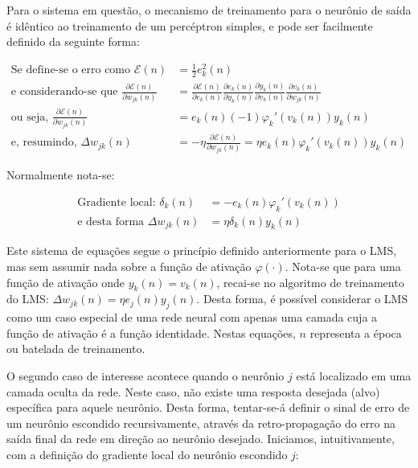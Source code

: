 Para o sistema em questão, o mecanismo de treinamento para o neurônio de saída
é idêntico ao treinamento de um percéptron simples, e pode ser facilmente
definido da seguinte forma:

\begin{align}
\text{Se define-se o erro como } \mathcal{E}(n) &= \frac{1}{2}e_{k}^{2}(n)
\label{eq:error-def} \\
\text{e considerando-se que } \frac{\partial\mathcal{E}(n)}{\partial
w_{jk}(n)} &= \frac{\partial\mathcal{E}(n)}{\partial e_k(n)} \frac{\partial
e_k(n)}{\partial y_k(n)} \frac{\partial y_k(n)}{\partial v_k(n)}
\frac{\partial v_k(n)}{\partial w_{jk}(n)} \label{eq:partials} \\
\text{ou seja, } \frac{\partial\mathcal{E}(n)}{\partial
w_{jk}(n)} &= e_k(n)(-1)\varphi_{k}'(v_{k}(n))y_{k}(n)
\label{eq:partials-solution} \\
\text{e, resumindo, } \Delta w_{jk}(n) &=
-\eta\frac{\partial\mathcal{E}(n)}{\partial w_{jk}(n)} = \eta
e_{k}(n)\varphi_{k}'(v_{k}(n))y_{k}(n)
\end{align}

Normalmente nota-se:

\begin{align}
\text{Gradiente local: } \delta_k(n) &= - e_k(n)\varphi_{k}'(v_k(n)) \\
\text{e desta forma } \Delta w_{jk}(n) &= \eta\delta_k(n)y_{k}(n)
\label{eq:neural-train}
\end{align}

Este sistema de equações segue o princípio definido anteriormente para o LMS,
mas sem assumir nada sobre a função de ativação $\varphi(\cdot)$. Nota-se que
para uma função de ativação onde $y_k(n) = v_k(n)$, recai-se no algoritmo de
treinamento do LMS: $\Delta w_{jk}(n) = \eta e_{j}(n)y_{j}(n)$. Desta forma, é
possível considerar o LMS como um caso especial de uma rede neural com apenas
uma camada cuja a função de ativação é a função identidade. Nestas equações,
$n$ representa a época ou batelada de treinamento.

O segundo caso de interesse acontece quando o neurônio $j$ está localizado em
uma camada oculta da rede. Neste caso, não existe uma resposta desejada (alvo)
específica para aquele neurônio. Desta forma, tentar-se-á definir o sinal de
erro de um neurônio escondido recursivamente, através da retro-propagação do
erro na saída final da rede em direção ao neurônio desejado. Iniciamos,
intuitivamente, com a definição do gradiente local do neurônio escondido $j$:

